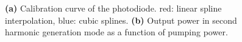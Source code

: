 \documentclass[a4paper]{scrartcl}
\numberwithin{equation}{section}
\numberwithin{figure}{section}
\numberwithin{table}{section}
\begin{document}
\begin{figure}
\centering
{}
\hfill
{}
\caption{\small \textbf{(a)} Calibration curve of the photodiode. red: linear spline interpolation, blue: cubic splines. \textbf{(b)} Output power in second harmonic generation mode as a function of pumping power.}
\label{fig:diode}
\end{figure}
\end{document}
